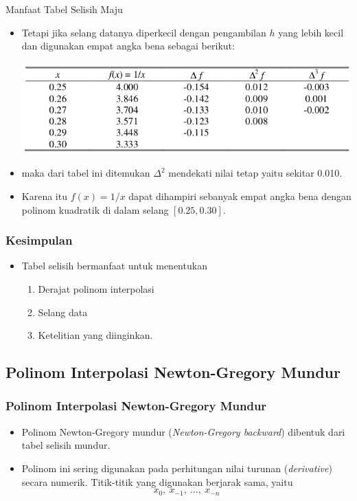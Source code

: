 \documentclass[pdflatex,compress,mathserif]{beamer}
\begin{document}
\begin{frame}{Manfaat Tabel Selisih Maju}
	\begin{itemize}
		\item Tetapi jika selang datanya diperkecil dengan pengambilan $ h $ yang lebih kecil dan digunakan empat angka bena sebagai berikut:
		\begin{center}
			\includegraphics[width=0.7\linewidth]{img/img25}
		\end{center}
		\item maka dari tabel ini ditemukan $\Delta^2$ mendekati nilai tetap yaitu sekitar 0.010.
		\item Karena itu $ f(x) = 1/x $ dapat dihampiri sebanyak empat angka bena dengan polinom kuadratik di dalam selang $ [0.25, 0.30] $.
	\end{itemize}
\end{frame}

\begin{frame}
	\frametitle{Kesimpulan}
	\begin{itemize}
		\item Tabel selisih bermanfaat untuk menentukan
		\begin{enumerate}
			\item Derajat polinom interpolasi
			\item Selang data
			\item Ketelitian yang diinginkan.
		\end{enumerate}
	\end{itemize}
\end{frame}

\subsection{Polinom Interpolasi Newton-Gregory Mundur}

\begin{frame}
	\frametitle{Polinom Interpolasi Newton-Gregory Mundur}
	\begin{itemize}
		\item Polinom Newton-Gregory mundur (\textit{Newton-Gregory backward}) dibentuk dari tabel selisih mundur.
		\item Polinom ini sering digunakan pada perhitungan nilai turunan (\textit{derivative}) secara numerik. Titik-titik yang digunakan berjarak sama, yaitu
		\[ x_0,~x_{-1},~\dots,~x_{-n} \]
	\end{itemize}
\end{frame}
\end{document}
